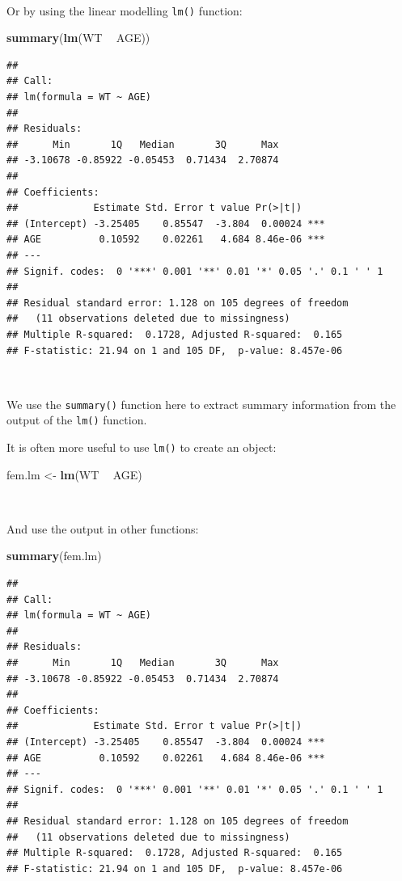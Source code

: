 \documentclass[12pt,a4paper]{book}
\newenvironment{Shaded}{\begin{snugshade}}{\end{snugshade}}
\newcommand{\KeywordTok}[1]{\textcolor[rgb]{0.13,0.29,0.53}{\textbf{#1}}}
\newcommand{\StringTok}[1]{\textcolor[rgb]{0.31,0.60,0.02}{#1}}
\newcommand{\OperatorTok}[1]{\textcolor[rgb]{0.81,0.36,0.00}{\textbf{#1}}}
\newcommand{\NormalTok}[1]{#1}
\theoremstyle{definition}
\theoremstyle{definition}
\theoremstyle{definition}
\theoremstyle{remark}
\begin{document}
~

Or by using the linear modelling \texttt{lm()} function:

\begin{Shaded}
\begin{Highlighting}[]
\KeywordTok{summary}\NormalTok{(}\KeywordTok{lm}\NormalTok{(WT }\OperatorTok{~}\StringTok{ }\NormalTok{AGE))}
\end{Highlighting}
\end{Shaded}

\begin{verbatim}
## 
## Call:
## lm(formula = WT ~ AGE)
## 
## Residuals:
##      Min       1Q   Median       3Q      Max 
## -3.10678 -0.85922 -0.05453  0.71434  2.70874 
## 
## Coefficients:
##             Estimate Std. Error t value Pr(>|t|)    
## (Intercept) -3.25405    0.85547  -3.804  0.00024 ***
## AGE          0.10592    0.02261   4.684 8.46e-06 ***
## ---
## Signif. codes:  0 '***' 0.001 '**' 0.01 '*' 0.05 '.' 0.1 ' ' 1
## 
## Residual standard error: 1.128 on 105 degrees of freedom
##   (11 observations deleted due to missingness)
## Multiple R-squared:  0.1728, Adjusted R-squared:  0.165 
## F-statistic: 21.94 on 1 and 105 DF,  p-value: 8.457e-06
\end{verbatim}

~

We use the \texttt{summary()} function here to extract summary
information from the output of the \texttt{lm()} function.

It is often more useful to use \texttt{lm()} to create an object:

\begin{Shaded}
\begin{Highlighting}[]
\NormalTok{fem.lm <-}\StringTok{ }\KeywordTok{lm}\NormalTok{(WT }\OperatorTok{~}\StringTok{ }\NormalTok{AGE)}
\end{Highlighting}
\end{Shaded}

~

And use the output in other functions:

\begin{Shaded}
\begin{Highlighting}[]
\KeywordTok{summary}\NormalTok{(fem.lm)}
\end{Highlighting}
\end{Shaded}

\begin{verbatim}
## 
## Call:
## lm(formula = WT ~ AGE)
## 
## Residuals:
##      Min       1Q   Median       3Q      Max 
## -3.10678 -0.85922 -0.05453  0.71434  2.70874 
## 
## Coefficients:
##             Estimate Std. Error t value Pr(>|t|)    
## (Intercept) -3.25405    0.85547  -3.804  0.00024 ***
## AGE          0.10592    0.02261   4.684 8.46e-06 ***
## ---
## Signif. codes:  0 '***' 0.001 '**' 0.01 '*' 0.05 '.' 0.1 ' ' 1
## 
## Residual standard error: 1.128 on 105 degrees of freedom
##   (11 observations deleted due to missingness)
## Multiple R-squared:  0.1728, Adjusted R-squared:  0.165 
## F-statistic: 21.94 on 1 and 105 DF,  p-value: 8.457e-06
\end{verbatim}
\end{document}
